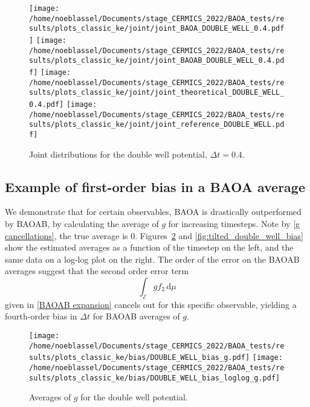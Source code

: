 \begin{figure}[htbp]
  \begin{center}
    \texttt{[image: /home/noeblassel/Documents/stage\_CERMICS\_2022/BAOA\_tests/results/plots\_classic\_ke/joint/joint\_BAOA\_DOUBLE\_WELL\_0.4.pdf]}
    \texttt{[image: /home/noeblassel/Documents/stage\_CERMICS\_2022/BAOA\_tests/results/plots\_classic\_ke/joint/joint\_BAOAB\_DOUBLE\_WELL\_0.4.pdf]}
    \texttt{[image: /home/noeblassel/Documents/stage\_CERMICS\_2022/BAOA\_tests/results/plots\_classic\_ke/joint/joint\_theoretical\_DOUBLE\_WELL\_0.4.pdf]}
    \texttt{[image: /home/noeblassel/Documents/stage\_CERMICS\_2022/BAOA\_tests/results/plots\_classic\_ke/joint/joint\_reference\_DOUBLE\_WELL.pdf]}
    \caption{ \label{fig:joint_double_well}
      Joint distributions for the double well potential, $\Delta t=0.4$.
    }
  \end{center}
\end{figure}

\subsection{Example of first-order bias in a BAOA average}\label{why muP bad}
We demonstrate that for certain observables, BAOA is drastically outperformed by BAOAB, by calculating the average of $g$ for increasing timesteps. Note by \eqref{g cancellations}, the true average is 0. Figures~\ref{fig:double_well_bias} and \ref{fig:tilted_double_well_bias} show the estimated averages as a function of the timestep on the left, and the same data on a log-log plot on the right. The order of the error on the BAOAB averages suggest that the second order error term
$$\int_{\mathcal E}gf_2\,\mathrm{d}\mu$$
given in \eqref{BAOAB expansion} cancels out for this specific observable, yielding a fourth-order bias in $\Delta t$ for BAOAB averages of $g$.

\begin{figure}[htbp]
  \begin{center}
    \texttt{[image: /home/noeblassel/Documents/stage\_CERMICS\_2022/BAOA\_tests/results/plots\_classic\_ke/bias/DOUBLE\_WELL\_bias\_g.pdf]}
    \texttt{[image: /home/noeblassel/Documents/stage\_CERMICS\_2022/BAOA\_tests/results/plots\_classic\_ke/bias/DOUBLE\_WELL\_bias\_loglog\_g.pdf]}
    \caption{ \label{fig:double_well_bias}
      Averages of $g$ for the double well potential.
    }
  \end{center}
\end{figure}

